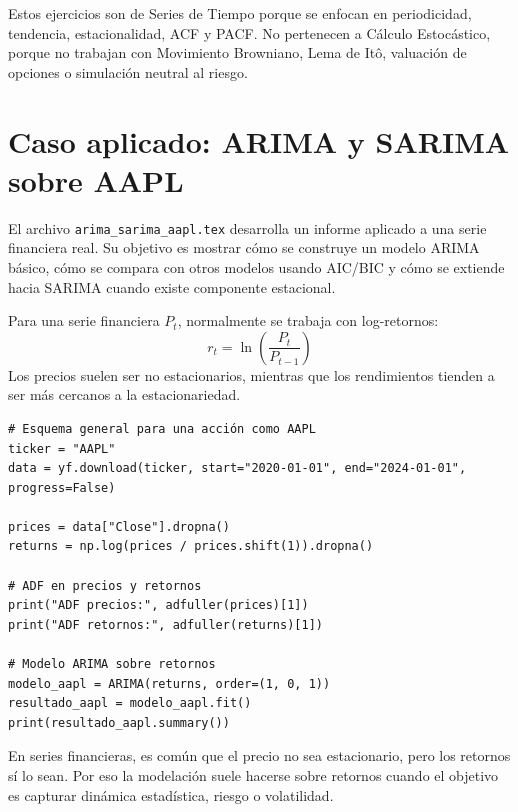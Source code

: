 \documentclass[12pt,a4paper]{article}
\begin{document}
\begin{interpretacion}
Estos ejercicios son de Series de Tiempo porque se enfocan en periodicidad, tendencia, estacionalidad, ACF y PACF. No pertenecen a Cálculo Estocástico, porque no trabajan con Movimiento Browniano, Lema de Itô, valuación de opciones o simulación neutral al riesgo.
\end{interpretacion}

\section{Caso aplicado: ARIMA y SARIMA sobre AAPL}

\begin{markdowncell}
El archivo \texttt{arima\_sarima\_aapl.tex} desarrolla un informe aplicado a una serie financiera real. Su objetivo es mostrar cómo se construye un modelo ARIMA básico, cómo se compara con otros modelos usando AIC/BIC y cómo se extiende hacia SARIMA cuando existe componente estacional.
\end{markdowncell}

\begin{latexcell}
Para una serie financiera \(P_t\), normalmente se trabaja con log-retornos:
\[
r_t = \ln\left(\frac{P_t}{P_{t-1}}\right)
\]
Los precios suelen ser no estacionarios, mientras que los rendimientos tienden a ser más cercanos a la estacionariedad.
\end{latexcell}

\begin{lstlisting}[style=pythonstyle]
# Esquema general para una acción como AAPL
ticker = "AAPL"
data = yf.download(ticker, start="2020-01-01", end="2024-01-01", progress=False)

prices = data["Close"].dropna()
returns = np.log(prices / prices.shift(1)).dropna()

# ADF en precios y retornos
print("ADF precios:", adfuller(prices)[1])
print("ADF retornos:", adfuller(returns)[1])

# Modelo ARIMA sobre retornos
modelo_aapl = ARIMA(returns, order=(1, 0, 1))
resultado_aapl = modelo_aapl.fit()
print(resultado_aapl.summary())
\end{lstlisting}

\begin{interpretacion}
En series financieras, es común que el precio no sea estacionario, pero los retornos sí lo sean. Por eso la modelación suele hacerse sobre retornos cuando el objetivo es capturar dinámica estadística, riesgo o volatilidad.
\end{interpretacion}
\end{document}
